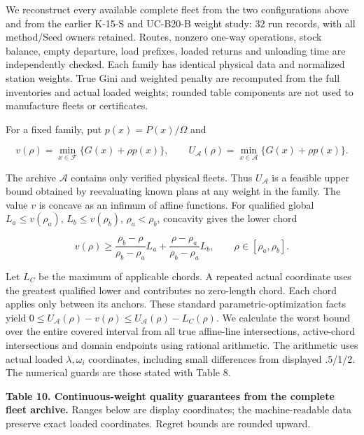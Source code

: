 \documentclass[
  american,
  11pt,
]{article}
\begin{document}
We reconstruct every available complete fleet from the two
configurations above and from the earlier K-15-S and UC-B20-B weight
study: 32 run records, with all method/Seed owners retained. Routes,
nonzero one-way operations, stock balance, empty departure, load
prefixes, loaded returns and unloading time are independently checked.
Each family has identical physical data and normalized station weights.
True Gini and weighted penalty are recomputed from the full inventories
and actual loaded weights; rounded table components are not used to
manufacture fleets or certificates.

For a fixed family, put \(p(x)=P(x)/\Omega\) and

\[
v(\rho)=\min_{x\in\mathcal F}\{G(x)+\rho p(x)\},\qquad
U_{\mathcal A}(\rho)=\min_{x\in\mathcal A}\{G(x)+\rho p(x)\}.
\]

The archive \(\mathcal A\) contains only verified physical fleets. Thus
\(U_{\mathcal A}\) is a feasible upper bound obtained by reevaluating
known plans at any weight in the family. The value \(v\) is concave as
an infimum of affine functions. For qualified global
\(L_a\le v(\rho_a)\), \(L_b\le v(\rho_b)\), \(\rho_a<\rho_b\), concavity
gives the lower chord

\[
v(\rho)\ge\frac{\rho_b-\rho}{\rho_b-\rho_a}L_a+
\frac{\rho-\rho_a}{\rho_b-\rho_a}L_b,\qquad \rho\in[\rho_a,\rho_b].
\]

Let \(L_C\) be the maximum of applicable chords. A repeated actual
coordinate uses the greatest qualified lower and contributes no
zero-length chord. Each chord applies only between its anchors. These
standard parametric-optimization facts yield
\(0\le U_{\mathcal A}(\rho)-v(\rho)\le U_{\mathcal A}(\rho)-L_C(\rho)\).
We calculate the worst bound over the entire covered interval from all
true affine-line intersections, active-chord intersections and domain
endpoints using rational arithmetic. The arithmetic uses actual loaded
\(\lambda,\omega_i\) coordinates, including small differences from
displayed .5/1/2. The numerical guards are those stated with Table 8.


\textbf{Table 10. Continuous-weight quality guarantees from the complete
fleet archive.} Ranges below are display coordinates; the
machine-readable data preserve exact loaded coordinates. Regret bounds
are rounded upward.
\end{document}

